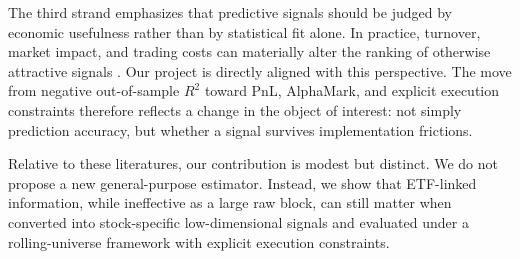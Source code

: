 The third strand emphasizes that predictive signals should be judged by economic usefulness rather than by statistical fit alone. In practice, turnover, market impact, and trading costs can materially alter the ranking of otherwise attractive signals \citep{frazzini2018trading,novymarx2016taxonomy}. Our project is directly aligned with this perspective. The move from negative out-of-sample $R^2$ toward PnL, AlphaMark, and explicit execution constraints therefore reflects a change in the object of interest: not simply prediction accuracy, but whether a signal survives implementation frictions.

Relative to these literatures, our contribution is modest but distinct. We do not propose a new general-purpose estimator. Instead, we show that ETF-linked information, while ineffective as a large raw block, can still matter when converted into stock-specific low-dimensional signals and evaluated under a rolling-universe framework with explicit execution constraints.
